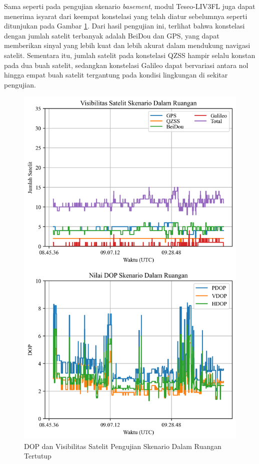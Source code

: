 Sama seperti pada pengujian skenario \textit{basement}, modul Teseo-LIV3FL juga dapat menerima isyarat dari keempat konstelasi yang telah diatur sebelumnya seperti ditunjukan pada Gambar \ref{Fig: indoor-sats_dop}. Dari hasil pengujian ini, terlihat bahwa konstelasi dengan jumlah satelit terbanyak adalah BeiDou dan GPS, yang dapat memberikan sinyal yang lebih kuat dan lebih akurat dalam mendukung navigasi satelit. Sementara itu, jumlah satelit pada konstelasi QZSS hampir selalu konstan pada dua buah satelit, sedangkan konstelasi Galileo dapat bervariasi antara nol hingga empat buah satelit tergantung pada kondisi lingkungan di sekitar pengujian. 

\begin{figure}[H]
	\centering
	\captionsetup{justification=centering}
	\includegraphics[width=12cm]{contents/chapter-4/2-skenario-indoor/sats_dop.png}
	\caption{DOP dan Visibilitas Satelit Pengujian Skenario Dalam Ruangan Tertutup}
	\label{Fig: indoor-sats_dop}
\end{figure}

